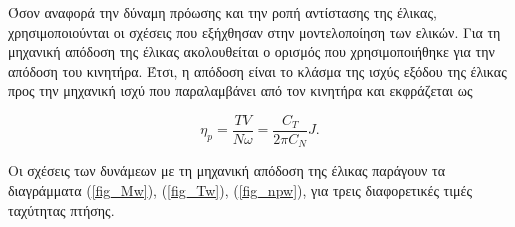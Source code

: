 Όσον αναφορά την δύναμη πρόωσης και την ροπή αντίστασης της έλικας,  
χρησιμοποιούνται οι σχέσεις που εξήχθησαν στην μοντελοποίηση των ελικών. Για τη 
μηχανική απόδοση της έλικας ακολουθείται ο ορισμός που χρησιμοποιήθηκε για την 
απόδοση του κινητήρα. Έτσι, η απόδοση είναι το κλάσμα της ισχύς εξόδου της 
έλικας προς την μηχανική ισχύ που παραλαμβάνει από τον κινητήρα και εκφράζεται 
ως

\begin{equation*}
    \eta_{p} = \frac{T V}{N \omega} = \frac{C_T}{2 \pi C_N}J.
\end{equation*}

Οι σχέσεις των δυνάμεων με τη μηχανική απόδοση της έλικας παράγουν τα 
διαγράμματα (\ref{fig_Mw}), (\ref{fig_Tw}), (\ref{fig_npw}), για τρεις 
διαφορετικές τιμές ταχύτητας πτήσης.

